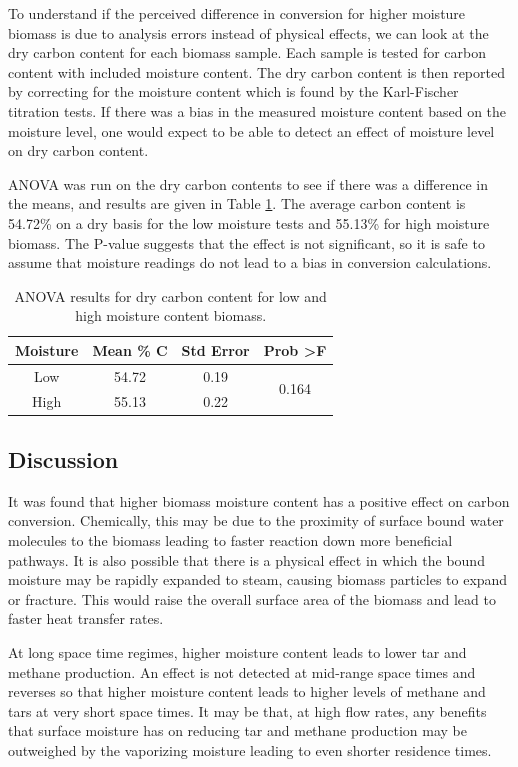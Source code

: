\documentclass[11pt,twocolumn]{article}
\begin{document}
To understand if the perceived difference in conversion for higher moisture biomass is due to analysis errors instead of physical effects, we can look at the dry carbon content for each biomass sample.  Each sample is tested for carbon content with included moisture content.  The dry carbon content is then reported by correcting for the moisture content which is found by the Karl-Fischer titration tests.  If there was a bias in the measured moisture content based on the moisture level, one would expect to be able to detect an effect of moisture level on dry carbon content.

ANOVA was run on the dry carbon contents to see if there was a difference in the means, and results are given in Table \ref{anova_moist}.  The average carbon content is 54.72\% on a dry basis for the low moisture tests and 55.13\% for high moisture biomass.  The P-value suggests that the effect is not significant, so it is safe to assume that moisture readings do not lead to a bias in conversion calculations.

\begin{table}
	\centering
	\caption{ANOVA results for dry carbon content for low and high moisture content biomass.}
	\label{anova_moist}
	\begin{tabular}{cccc}
	\toprule
	Moisture	& 	Mean \% C &  	Std Error	&	Prob \textgreater F \\
	\midrule
	Low		&	54.72	&	0.19		& 	\multirow{2}{*}{0.164}	\\
	High		&	55.13	&	0.22		& {} \\
	\bottomrule
	\end{tabular}
\end{table}

\subsection*{Discussion}

It was found that higher biomass moisture content has a positive effect on carbon conversion.  Chemically, this may be due to the proximity of surface bound water molecules to the biomass leading to faster reaction down more beneficial pathways.  It is also possible that there is a physical effect in which the bound moisture may be rapidly expanded to steam, causing biomass particles to expand or fracture.  This would raise the overall surface area of the biomass and lead to faster heat transfer rates.

At long space time regimes, higher moisture content leads to lower tar and methane production.  An effect is not detected at mid-range space times and reverses so that higher moisture content leads to higher levels of methane and tars at very short space times.  It may be that,  at high flow rates, any benefits that surface moisture has on reducing tar and methane production may be outweighed by the vaporizing moisture leading to even shorter residence times.
\end{document}
